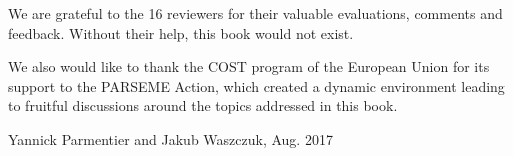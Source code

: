 \documentclass[output=paper]{langsci/langscibook}
\begin{document}
We are grateful to the 16 reviewers for their valuable evaluations,
comments and feedback. Without their help, this book would not exist.

We also would like to thank the COST program of the European Union for
its support to the PARSEME Action, which created a dynamic environment
leading to fruitful discussions around the topics addressed in this
book.

\begin{flushright}
  Yannick Parmentier and Jakub Waszczuk, Aug. 2017
\end{flushright}


\printbibliography[heading=subbibliography,notkeyword=this]
\end{document}

